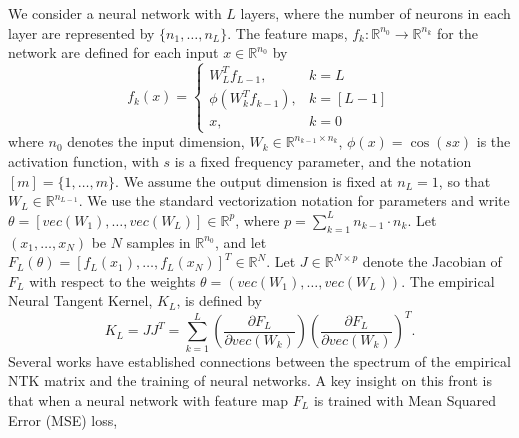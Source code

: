 \documentclass{article}
\theoremstyle{plain}
\theoremstyle{definition}
\theoremstyle{remark}
\newcommand\R{\mathbb{R}}
\begin{document}
We consider a neural network with $L$ layers, where the number of neurons in each layer are represented by 
$\{n_1,\ldots,n_L\}$. The feature maps,
$f_k : \R^{n_0} \rightarrow \R^{n_k}$ for the network are defined for each input $x \in \R^{n_0}$ by
\begin{equation}\label{network_defn}
    f_k(x) =
    \begin{cases}
    W_L^Tf_{L-1}, & k = L \\
    \phi(W_k^Tf_{k-1}), & k = [L-1] \\
    x, & k = 0
    \end{cases}
\end{equation}
where $n_0$ denotes the input dimension, $W_k \in \R^{n_{k-1}\times n_k}$, 
$\phi(x) = \cos(sx)$ is the activation function, with $s$ is a fixed frequency parameter, and the notation
$[m] = \{1,\ldots,m\}$. We assume the output dimension is fixed at $n_L = 1$, so that
$W_L \in \R^{n_{L-1}}$. We use the standard vectorization notation for parameters and write $\theta = [vec(W_1),\ldots,vec(W_L)] \in \R^p$, where 
$p = \sum_{k=1}^Ln_{k-1}\cdot n_k$. Let $(x_1,\ldots,x_N)$ be $N$ samples in 
$\R^{n_0}$, and let $F_L(\theta) = [f_L(x_1),\ldots,f_L(x_N)]^T \in 
\R^N$. Let $J \in \R^{N \times p}$ denote the Jacobian of $F_L$ with respect to the weights
$\theta = (vec(W_1),\ldots,vec(W_L))$. The empirical Neural Tangent Kernel, $K_L$,  is defined by
\begin{equation}
    K_L = JJ^T = \sum_{k=1}^L\left(\frac{\partial F_L}{\partial vec(W_k)} \right)
    \left(\frac{\partial F_L}{\partial vec(W_k)} \right)^T.
\end{equation}
Several works \cite{du2018gradient, allen2019convergence, oymak2020toward, song2019quadratic, nguyen2020global, zou2019improved} have established connections between the spectrum of the empirical NTK matrix and the training of neural networks. A key insight on this front is that when a neural network with feature map $F_L$ is trained with Mean Squared Error (MSE) loss, 
\end{document}
